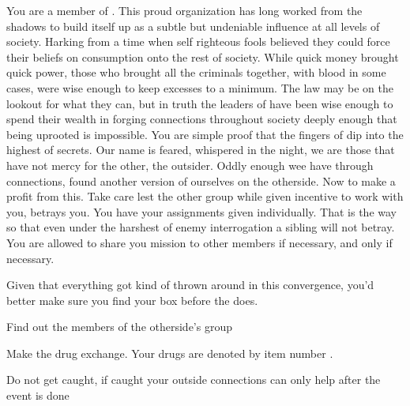 \documentclass[blue]{guildcamp3}
\begin{document}
\name{\bTechMob{}}


You are a member of \bTechMob{}. This proud organization has long worked from the shadows to build itself up as a subtle but undeniable influence at all levels of \bTechWorld{} society. Harking from a time when self righteous fools believed they could force their beliefs on consumption onto the rest of society. While quick money brought quick power, those who brought all the criminals together, with blood in some cases, were wise enough to keep excesses to a minimum. The law may be on the lookout for what they can, but in truth the leaders of \bTechMob{} have been wise enough to spend their wealth in forging connections throughout society deeply enough that being uprooted is impossible. You are simple proof that the fingers of \bTechMob{} dip into the highest of secrets. Our name is feared, whispered in the night, we are those that have not mercy for the other, the outsider. Oddly enough wee have through connections, found another version of ourselves on the otherside. Now to make a profit from this. Take care lest the other group while given incentive to work with you, betrays you. You have your assignments given individually. That is the way so that even under the harshest of enemy interrogation a sibling will not betray. You are allowed to share you mission to other members if necessary, and only if necessary.

Given that everything got kind of thrown around in this convergence, you'd better make sure you find your box before the \bMagicMob{} does. 

\begin{itemz}[Goals]
	\item Find out the members of the otherside's group
	\item Make the drug exchange. Your drugs are denoted by item number \iDrugsTech{}.
	\item Do not get caught, if caught your outside connections can only help after the event is done
\end{itemz}

\begin{members}
	\member{\cSciTwo{\intro}} 
	\member{\cSpecOpTwo{\intro}} 

\end{members}
\end{document}

